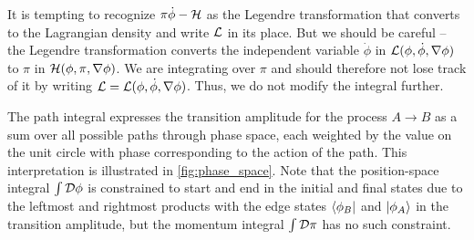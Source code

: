 It is tempting to recognize $\pi \dot\phi - \mathcal{H}$ as the Legendre transformation that converts to the Lagrangian density and write $\lagr$ in its place.
But we should be careful -- the Legendre transformation converts the independent variable $\dot\phi$ in $\mathcal{L}(\phi, \dot\phi, \nabla\phi)$ to $\pi$ in $\mathcal{H}(\phi, \pi, \nabla\phi)$.
We are integrating over $\pi$ and should therefore not lose track of it by writing $\mathcal{L} = \mathcal{L}(\phi, \dot\phi, \nabla\phi)$.
Thus, we do not modify the integral further.

\iffalse
Note that the combination of the Hamiltonian and the fields in the exponential is precisely the Legendre transformation that converts between the Hamiltonian density $\ham$ and the Lagrangian density $\lagr$.
Thus, we might as well express the transition amplitude as the \textbf{path integral}
\begin{equation}
	\transampl = \int \pathintdif \pi \int_{\phi_A(\vec{x})}^{\phi_B(\vec{x})} \pathintdif \phi \, \exp \big( i S \left[ \pi(\vec{x}, t), \phi(\vec{x}, t) \right] / \hbar \big) ,
\label{eq:tft:path_integral_lagrangian}
\end{equation}
with the action
\begin{equation}
	S \left[ \pi(\vec{x}, t), \phi(\vec{x}, t) \right] = \int_0^T \dif t \int \dif^3 x \, \lagr \left( \pi(\vec{x}, t), \phi(\vec{x}, t) \right) . \qquad \text{TODO: factor $c$?}
\label{eq:tft:action}
\end{equation}
\fi
The path integral expresses the transition amplitude for the process $A \rightarrow B$ as a sum over all possible paths through phase space, each weighted by the value on the unit circle with phase corresponding to the action of the path.
This interpretation is illustrated in \cref{fig:phase_space}.
Note that the position-space integral $\int \mathcal{D} \phi$ is constrained to start and end in the initial and final states due to the leftmost and rightmost products with the edge states $\bra{\phi_B}$ and $\ket{\phi_A}$ in the transition amplitude, but the momentum integral $\int \mathcal{D} \pi$ has no such constraint.

